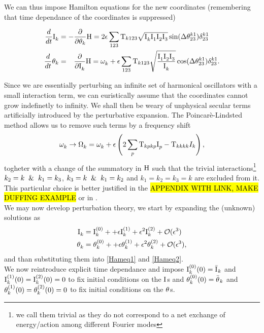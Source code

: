 We can thus impose Hamilton equations for the new coordinates (remembering that time dependance of the coordinates is suppressed)

\begin{align}
    \frac{d}{dt}\mathrm{I}^{}_k &= - \frac{\partial }{\partial \theta_k}\mathrm{H} = 2 \epsilon \sum_{123} \mathrm{T}_{k123} \sqrt{\mathrm{I}^{}_k\mathrm{I}^{}_1\mathrm{I}^{}_2\mathrm{I}^{}_3} \sin(\Delta\theta^{k1}_{23})\delta^{k1}_{23}
    \label{Hameq1}\\
    \frac{d}{dt}\theta_k &= \phantom{-} \frac{\partial }{\partial \mathrm{I}^{}_k}\mathrm{H} = \omega^{}_k + 
    \epsilon \sum_{123} \mathrm{T}_{k123} \sqrt{\frac{\mathrm{I}^{}_1\mathrm{I}^{}_2\mathrm{I}^{}_3}{\mathrm{I}^{}_k}}\cos(\Delta\theta^{k1}_{23})\delta^{k1}_{23}.
    \label{Hameq2}
\end{align}


Since we are essentially perturbing an infinite set of harmonical oscillators with a small interaction term, we can euristically assume that
the coordinates cannot grow indefinetly to infinity. We shall then be weary of unphysical secular terms artificially introduced by the perturbative
expansion. The Poincarè-Lindsted method allows us to remove such terms by a frequency shift
\begin{equation}
    \omega^{}_k \rightarrow \Omega^{}_k = \omega^{}_k + \epsilon \left(2\sum_p \mathrm{T}_{kpkp}\mathrm{I}^{}_p - \mathrm{T}_{kkkk}I_k \right),
    \label{shift_eq}
\end{equation}   
togheter with a change of the summatory in $\mathrm{H}$ such that the trivial interactions\footnote{
    we call them trivial as they do not correspond to a net exchange of energy/action among different Fourier modes
} $k_2=k \hspace{2mm}\&\hspace{2mm} k_1 = k_3$, $k_3=k \hspace{2mm}\& \hspace{2mm}k_1=k_2$ and $k_1=k_2=k_3=k$ are excluded from it. \\
This particular choice is better justified in the \hl{APPENDIX WITH LINK, MAKE DUFFING EXAMPLE} or in \cite{Nazarenko2011}. \\

We may now develop perturbation theory, we start by expanding the (unknown) solutions as
\begin{align}
    \mathrm{I}^{}_k &= \mathrm{I}^{(0)}_k +  + \epsilon \mathrm{I}^{(1)}_k + \epsilon^2 \mathrm{I}^{(2)}_k + \mathcal{O}(\epsilon^3) \\
    \theta^{}_k &= \theta^{(0)}_k +  + \epsilon \theta^{(1)}_k + \epsilon^2 \theta^{(2)}_k + \mathcal{O}(\epsilon^3),
\end{align}
and than substituting them into \eqref{Hameq1} and \eqref{Hameq2}. \\
We now reintroduce explicit time dependance and impose $\mathrm{I}^{(0)}_k(0) = \bar{\mathrm{I}^{}}_k$ and $\mathrm{I}^{(1)}_k(0) = \mathrm{I}^{(2)}_k(0) = 0$ to fix initial conditions on the $\mathrm{I}^{}$s and 
$\theta^{(0)}_k(0) = \bar{\theta^{}}_k$ and $\theta^{(1)}_k(0) = \theta^{(2)}_k(0) = 0$ to fix initial conditions on the $\theta^{}$s.\\

